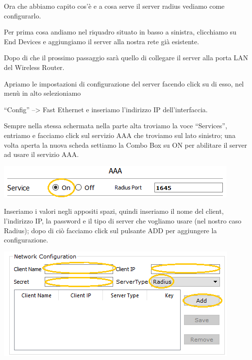 \smallskip

Ora che abbiamo capito cos’è e a cosa serve il server radius vediamo come configurarlo.

\smallskip

Per prima cosa andiamo nel riquadro situato in basso a sinistra, clicchiamo su End Devices e aggiungiamo il server alla nostra rete già esistente.

Dopo di che il prossimo passaggio sarà quello di collegare il server alla porta LAN del Wireless Router.

Apriamo le impostazioni di configurazione del server facendo click su di esso, nel menù in alto selezioniamo

“Config” --> Fast Ethernet e inseriamo l’indirizzo IP dell’interfaccia.

Sempre nella stessa schermata nella parte alta troviamo la voce “Services”, entriamo e facciamo click sul servizio AAA che troviamo sul lato sinistro; una volta aperta la nuova scheda settiamo la Combo Box su ON per abilitare il server ad usare il servizio AAA.


\begin{center}
    \includegraphics[width=\linewidth]{images/08.wireless/18.png}
\end{center}

Inseriamo i valori negli appositi spazi, quindi inseriamo il nome del client, l’indirizzo IP, la password e il tipo di server che vogliamo usare (nel nostro caso Radius); dopo di ciò facciamo click sul pulsante ADD per aggiungere la configurazione.


\begin{center}
    \includegraphics[width=\linewidth]{images/08.wireless/19.png}
\end{center}

